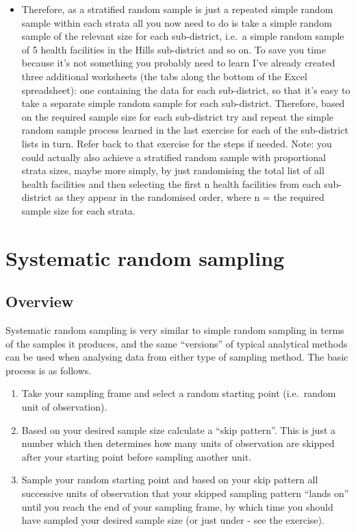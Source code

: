 \documentclass[
]{book}
\providecommand{\tightlist}{%
  \setlength{\itemsep}{0pt}\setlength{\parskip}{0pt}}
\begin{document}
\begin{itemize}
\tightlist
\item
  Therefore, as a stratified random sample is just a repeated simple random sample within each strata all you now need to do is take a simple random sample of the relevant size for each sub-district, i.e.~a simple random sample of 5 health facilities in the Hills sub-district and so on. To save you time because it's not something you probably need to learn I've already created three additional worksheets (the tabs along the bottom of the Excel spreadsheet): one containing the data for each sub-district, so that it's easy to take a separate simple random sample for each sub-district. Therefore, based on the required sample size for each sub-district try and repeat the simple random sample process learned in the last exercise for each of the sub-district lists in turn. Refer back to that exercise for the steps if needed. Note: you could actually also achieve a stratified random sample with proportional strata sizes, maybe more simply, by just randomising the total list of all health facilities and then selecting the first n health facilities from each sub-district as they appear in the randomised order, where n = the required sample size for each strata.
\end{itemize}

\hypertarget{systematic-random-sampling}{%
\section{Systematic random sampling}\label{systematic-random-sampling}}

\hypertarget{overview-3}{%
\subsection{Overview}\label{overview-3}}

Systematic random sampling is very similar to simple random sampling in terms of the samples it produces, and the same ``versions'' of typical analytical methods can be used when analysing data from either type of sampling method. The basic process is as follows.

\begin{enumerate}
\def\labelenumi{\arabic{enumi}.}
\item
  Take your sampling frame and select a random starting point (i.e.~random unit of observation).
\item
  Based on your desired sample size calculate a ``skip pattern''. This is just a number which then determines how many units of observation are skipped after your starting point before sampling another unit.
\item
  Sample your random starting point and based on your skip pattern all successive units of observation that your skipped sampling pattern ``lands on'' until you reach the end of your sampling frame, by which time you should have sampled your desired sample size (or just under - see the exercise).
\end{enumerate}
\end{document}
